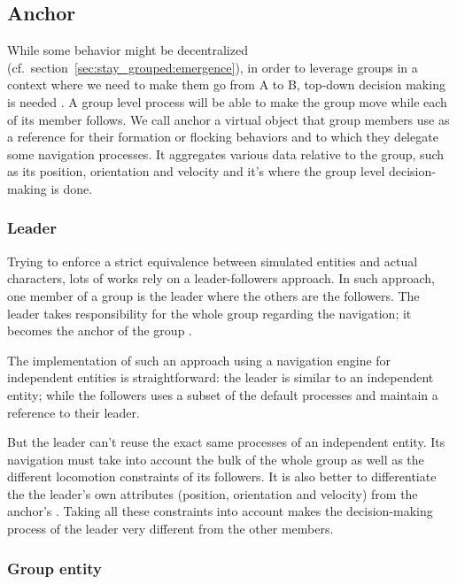 \documentclass[a4paper,titlepage]{article}
\begin{document}
\subsection{Anchor}
\label{sec:who_s_in_charge:anchor}

While some behavior might be decentralized (cf.\ section~\ref{sec:stay_grouped:emergence}), in order to leverage groups in a context where we need to make them go from A to B, top-down decision making is needed \cite{MusTha2001}. A group level process will be able to make the group move while each of its member follows. 
We call anchor a virtual object that group members use as a reference for their formation or flocking behaviors and to which they delegate some navigation processes. It aggregates various data relative to the group, such as its position, orientation and velocity and it’s where the group level decision-making is done.

\subsubsection{Leader}

Trying to enforce a strict equivalence between simulated entities and actual characters, lots of works rely on a leader-followers approach. In such approach, one member of a group is the leader where the others are the followers. The leader takes responsibility for the whole group regarding the navigation; it becomes the anchor of the group \cite{Loscos:2003wh,Qiu:2010ks}.

The implementation of such an approach using a navigation engine for independent entities is straightforward: the leader is similar to an independent entity; while the followers uses a subset of the default processes and maintain a reference to their leader.

But the leader can’t reuse the exact same processes of an independent entity. Its navigation must take into account the bulk of the whole group as well as the different locomotion constraints of its followers. It is also better to differentiate the the leader’s own attributes (position, orientation and velocity) from the anchor’s \cite{Millington:2006wz}. Taking all these constraints into account makes the decision-making process of the leader very different from the other members.

\subsubsection{Group entity}
\end{document}
